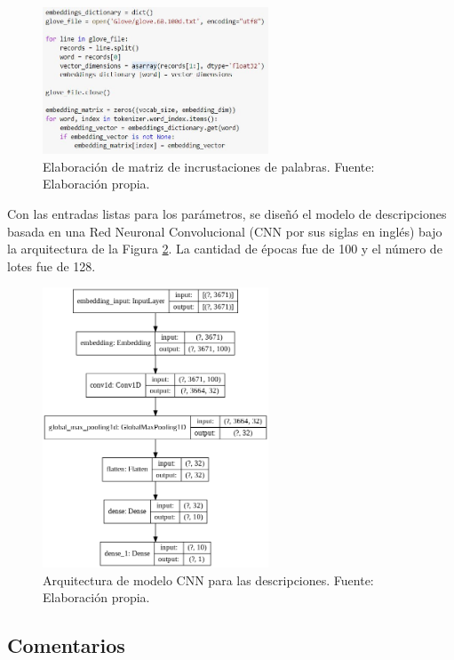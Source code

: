 \begin{figure}[!ht]
	\begin{center}
		\includegraphics[width=0.60\textwidth]{4/figures/description_glove.jpg}
		\caption{Elaboración de matriz de incrustaciones de palabras. Fuente: Elaboración propia.}
		\label{4:fig37}
	\end{center}
\end{figure}

Con las entradas listas para los parámetros, se diseñó el modelo de descripciones basada en una Red Neuronal Convolucional (CNN por sus siglas en inglés) bajo la arquitectura de la Figura \ref{4:fig38}. La cantidad de épocas fue de 100 y el número de lotes fue de 128.

\begin{figure}[!ht]
	\begin{center}
		\includegraphics[width=0.60\textwidth]{4/figures/model_cnn_description.png}
		\caption{Arquitectura de modelo CNN para las descripciones. Fuente: Elaboración propia.}
		\label{4:fig38}
	\end{center}
\end{figure}

\subsection{Comentarios}